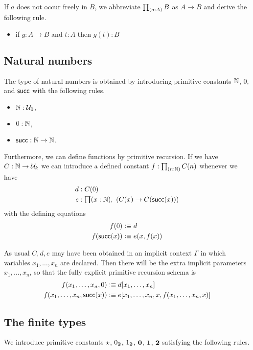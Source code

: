 If $a$ does not occur freely in $B$, we abbreviate $\prd{a:A} B$ as $A
\rightarrow B$ and derive the following rule.

\begin{itemize}
\item if $g:A \rightarrow B$ and $t:A$ then $g(t):B$
\end{itemize}

\subsection*{Natural numbers}

The type of natural numbers is obtained by introducing primitive constants
$\mathbb{N}$, $0$, and $\mathsf{succ}$ with the following rules.
\begin{itemize}
  \item $\mathbb{N} : \mathcal{U}_0$,
  \item $0:\mathbb{N}$,
  \item $\mathsf{succ}:\mathbb{N}\rightarrow \mathbb{N}$.
\end{itemize}

Furthermore, we can define functions by primitive recursion.  If we have
$C : \mathbb{N} \rightarrow \mathcal{U}_k $ we can introduce a defined constant $f:\prd{n:\N}C(n)$ whenever we have
  \begin{align*}
    d & : C(0) \\
    e & : \prd{x:\N}(C(x)\rightarrow C(\suc (x)))
  \end{align*}
with the defining equations
  \begin{align*}
    f(0) & \vcentcolon\equiv d \\
    f(\mathsf{succ} (x)) & \vcentcolon\equiv e(x,f(x))
  \end{align*}
 
As usual $C,d,e$ may have been obtained in an implicit context $\Gamma$ in which variables $x_1,\ldots,x_n$ are declared.  Then there will be the extra implicit parameters $x_1,\ldots,x_n$, so that the fully explicit primitive recursion schema is
  \begin{align*}
    f(x_1,\dots,x_n,0) & \vcentcolon\equiv d[x_1,\dots,x_n] \\
    f(x_1,\dots,x_n,\mathsf{succ} (x)) & \vcentcolon\equiv e[x_1,\dots,x_n,x,f(x_1,\dots,x_n,x)]
  \end{align*}

\subsection*{The finite types}

We introduce primitive constants $\star$, ${0_{\mathbf{2}}}$, ${1_{\mathbf{2}}}$, $\mathbf{0}$,
$\mathbf{1}$, $\mathbf{2}$ satisfying the following rules.

